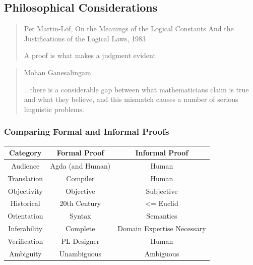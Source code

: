 \documentclass[9pt]{beamer}
\begin{document}
\subsection{Philosophical Considerations}

\begin{frame}

\begin{quote}{Per Martin-Löf, On the Meanings of the Logical Constants And the
    Justifications of the Logical Laws, 1983}

A proof is what makes a judgment evident %

\end{quote}


\end{frame}


\begin{frame}
\begin{quote}{Mohan Ganesalingam}

...there is a considerable gap between what mathematicians claim is true and what
they believe, and this mismatch causes a number of serious linguistic problems.

\end{quote}
\end{frame}


\begin{frame}

\frametitle{Comparing Formal and Informal Proofs}


\centering




\begin{tabular}{|c|c|c|} \hline
  Category & Formal Proof & Informal Proof \\ \hline
  Audience & Agda (and Human) & Human \\ \hline
  Translation & Compiler & Human \\ \hline
  Objectivity & Objective & Subjective \\ \hline %
  Historical & 20th Century & <= Euclid \\ \hline
  Orientation & Syntax & Semantics \\ \hline
  Inferability & Complete & Domain Expertise Necessary \\ \hline
  Verification & PL Designer & Human \\ \hline
  Ambiguity & Unambiguous & Ambiguous \\ \hline

\end{tabular}


\end{frame}
\end{document}
